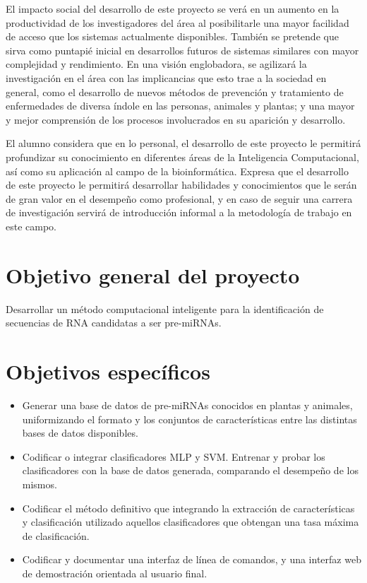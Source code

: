 \documentclass[12pt,bibliography=oldstyle,DIV=14,parskip=full-,titlepage]{scrartcl}
\begin{document}
El impacto social del desarrollo de este proyecto se verá en un
aumento en la productividad de los investigadores del área al
posibilitarle una mayor facilidad de acceso que los sistemas actualmente
disponibles. También se pretende que sirva como puntapié inicial en
desarrollos futuros de sistemas similares con mayor complejidad y
rendimiento. En una visión englobadora, se agilizará la investigación
en el área con las implicancias que esto trae a la sociedad en
general, como el desarrollo de nuevos métodos de prevención y
tratamiento de enfermedades de diversa índole en las personas,
animales y plantas; y una mayor y mejor comprensión de los procesos
involucrados en su aparición y desarrollo.

El alumno considera que en lo personal, el desarrollo de este proyecto
le permitirá profundizar su conocimiento en diferentes áreas de la
Inteligencia Computacional, así como su aplicación al campo de la
bioinformática. Expresa que el desarrollo de este proyecto le
permitirá desarrollar habilidades y conocimientos que le serán de gran
valor en el desempeño como profesional, y en caso de seguir una
carrera de investigación servirá de introducción informal a la
metodología de trabajo en este campo.
%
%
\section{Objetivo general del proyecto}
Desarrollar un método computacional inteligente para la identificación
de secuencias de RNA candidatas a ser pre-miRNAs.
\section{Objetivos específicos}
\begin{itemize}
\item Generar una base de datos de pre-miRNAs conocidos en plantas y
  animales, uniformizando el formato y los conjuntos de
  características entre las distintas bases de datos disponibles.
\item Codificar o integrar clasificadores MLP y SVM. Entrenar y probar
  los clasificadores con la base de datos generada, comparando el
  desempeño de los mismos.
\item Codificar el método definitivo que integrando la extracción de
  características y clasificación utilizado aquellos clasificadores
  que obtengan una tasa máxima de clasificación.
\item Codificar y documentar una interfaz de línea de comandos, y una
  interfaz web de demostración orientada al usuario final.
\end{itemize}
%
%
\end{document}
